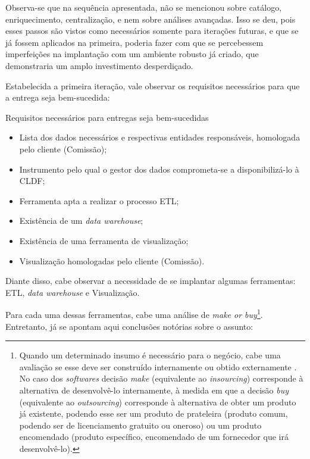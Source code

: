 Observa-se que na sequência apresentada, não se mencionou sobre catálogo, enriquecimento, centralização, e nem sobre análises avançadas. Isso se deu, pois esses passos são vistos como necessários somente para iterações futuras, e que se já fossem aplicados na primeira, poderia fazer com que se percebessem imperfeições na implantação com um ambiente robusto já criado, que demonstraria um amplo investimento desperdiçado.

Estabelecida a primeira iteração, vale observar os requisitos necessários para que a entrega seja bem-sucedida:

\begin{env-destaque}{Requisitos necessários para entregas seja bem-sucedidas}
\begin{itemize}
    \item Lista dos dados necessários e respectivas entidades responsáveis, homologada pelo cliente (Comissão);
    \item Instrumento pelo qual o gestor dos dados comprometa-se a disponibilizá-lo à CLDF;
    \item Ferramenta apta a realizar o processo ETL;
    \item Existência de um \emph{data warehouse};
    \item Existência de uma ferramenta de visualização;
    \item Visualização homologadas pelo cliente (Comissão).
\end{itemize}
\end{env-destaque}

Diante disso, cabe observar a necessidade de se implantar algumas ferramentas: ETL, \emph{data warehouse} e Visualização. 

Para cada uma dessas ferramentas, cabe uma análise de \emph{make or buy}\footnote{Quando um determinado insumo é necessário para o negócio, cabe uma avaliação se esse deve ser construído internamente ou obtido externamente \cite{makeorbuy}. No caso dos \emph{softwares} decisão \emph{make} (equivalente ao \emph{insourcing}) corresponde à alternativa de desenvolvê-lo internamente, à medida em que a decisão \emph{buy} (equivalente ao \emph{outsourcing}) corresponde à alternativa de obter um produto já existente, podendo esse ser um produto de prateleira (produto comum, podendo ser de licenciamento gratuito ou oneroso) ou um produto encomendado (produto específico, encomendado de um fornecedor que irá desenvolvê-lo).}. Entretanto, já se apontam aqui conclusões notórias sobre o assunto:

